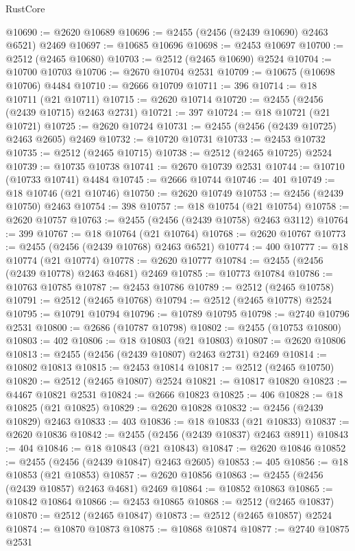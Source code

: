 \begin{lexlean}{RustCore}
\begin{coremodule}
@10690 := @2620 @10689
@10696 := @2455 (@2456 (@2439 @10690) @2463 @6521) @2469
@10697 := @10685 @10696
@10698 := @2453 @10697
@10700 := @2512 (@2465 @10680)
@10703 := @2512 (@2465 @10690) @2524
@10704 := @10700 @10703
@10706 := @2670 @10704 @2531
@10709 := @10675 (@10698 @10706) @4484
@10710 := @2666 @10709
@10711 := 396
@10714 := @18 @10711 (@21 @10711)
@10715 := @2620 @10714
@10720 := @2455 (@2456 (@2439 @10715) @2463 @2731)
@10721 := 397
@10724 := @18 @10721 (@21 @10721)
@10725 := @2620 @10724
@10731 := @2455 (@2456 (@2439 @10725) @2463 @2605) @2469
@10732 := @10720 @10731
@10733 := @2453 @10732
@10735 := @2512 (@2465 @10715)
@10738 := @2512 (@2465 @10725) @2524
@10739 := @10735 @10738
@10741 := @2670 @10739 @2531
@10744 := @10710 (@10733 @10741) @4484
@10745 := @2666 @10744
@10746 := 401
@10749 := @18 @10746 (@21 @10746)
@10750 := @2620 @10749
@10753 := @2456 (@2439 @10750) @2463
@10754 := 398
@10757 := @18 @10754 (@21 @10754)
@10758 := @2620 @10757
@10763 := @2455 (@2456 (@2439 @10758) @2463 @3112)
@10764 := 399
@10767 := @18 @10764 (@21 @10764)
@10768 := @2620 @10767
@10773 := @2455 (@2456 (@2439 @10768) @2463 @6521)
@10774 := 400
@10777 := @18 @10774 (@21 @10774)
@10778 := @2620 @10777
@10784 := @2455 (@2456 (@2439 @10778) @2463 @4681) @2469
@10785 := @10773 @10784
@10786 := @10763 @10785
@10787 := @2453 @10786
@10789 := @2512 (@2465 @10758)
@10791 := @2512 (@2465 @10768)
@10794 := @2512 (@2465 @10778) @2524
@10795 := @10791 @10794
@10796 := @10789 @10795
@10798 := @2740 @10796 @2531
@10800 := @2686 (@10787 @10798)
@10802 := @2455 (@10753 @10800)
@10803 := 402
@10806 := @18 @10803 (@21 @10803)
@10807 := @2620 @10806
@10813 := @2455 (@2456 (@2439 @10807) @2463 @2731) @2469
@10814 := @10802 @10813
@10815 := @2453 @10814
@10817 := @2512 (@2465 @10750)
@10820 := @2512 (@2465 @10807) @2524
@10821 := @10817 @10820
@10823 := @4467 @10821 @2531
@10824 := @2666 @10823
@10825 := 406
@10828 := @18 @10825 (@21 @10825)
@10829 := @2620 @10828
@10832 := @2456 (@2439 @10829) @2463
@10833 := 403
@10836 := @18 @10833 (@21 @10833)
@10837 := @2620 @10836
@10842 := @2455 (@2456 (@2439 @10837) @2463 @8911)
@10843 := 404
@10846 := @18 @10843 (@21 @10843)
@10847 := @2620 @10846
@10852 := @2455 (@2456 (@2439 @10847) @2463 @2605)
@10853 := 405
@10856 := @18 @10853 (@21 @10853)
@10857 := @2620 @10856
@10863 := @2455 (@2456 (@2439 @10857) @2463 @4681) @2469
@10864 := @10852 @10863
@10865 := @10842 @10864
@10866 := @2453 @10865
@10868 := @2512 (@2465 @10837)
@10870 := @2512 (@2465 @10847)
@10873 := @2512 (@2465 @10857) @2524
@10874 := @10870 @10873
@10875 := @10868 @10874
@10877 := @2740 @10875 @2531

\end{coremodule}
\end{lexlean}
